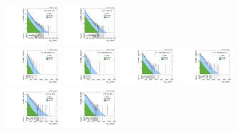 \begin{figure}[htbp]
  \includegraphics[width=0.18\textwidth]{fig/analysisAppendix/PostFit_SR_MVV__mu_LP_nobb_LDy_Run2.pdf}
  \includegraphics[width=0.18\textwidth]{fig/analysisAppendix/PostFit_SR_MVV__e_LP_nobb_LDy_Run2.pdf}\\
  \includegraphics[width=0.18\textwidth]{fig/analysisAppendix/PostFit_SR_MVV__mu_HP_vbf_LDy_Run2.pdf}
  \includegraphics[width=0.18\textwidth]{fig/analysisAppendix/PostFit_SR_MVV__e_HP_vbf_LDy_Run2.pdf}
  \includegraphics[width=0.18\textwidth]{fig/analysisAppendix/PostFit_SR_MVV__mu_LP_vbf_LDy_Run2.pdf}
  \includegraphics[width=0.18\textwidth]{fig/analysisAppendix/PostFit_SR_MVV__e_LP_vbf_LDy_Run2.pdf}\\
  \includegraphics[width=0.18\textwidth]{fig/analysisAppendix/PostFit_SR_MVV__mu_HP_bb_HDy_Run2.pdf}
  \includegraphics[width=0.18\textwidth]{fig/analysisAppendix/PostFit_SR_MVV__e_HP_bb_HDy_Run2.pdf}

\end{figure}
